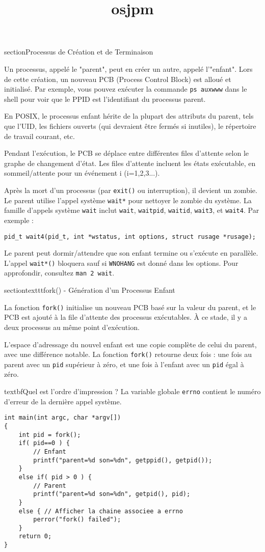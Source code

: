 \documentclass[12pt]{article}
\title{osjpm}
\author{}
\date{}
\begin{document}
\maketitle
\tableofcontents
\newpage

section{Processus de Création et de Terminaison}

Un processus, appelé le "parent", peut en créer un autre, appelé l'"enfant". Lors de cette création, un nouveau PCB (Process Control Block) est alloué et initialisé. Par exemple, vous pouvez exécuter la commande \texttt{ps auxwww} dans le shell pour voir que le PPID est l'identifiant du processus parent.

En POSIX, le processus enfant hérite de la plupart des attributs du parent, tels que l'UID, les fichiers ouverts (qui devraient être fermés si inutiles), le répertoire de travail courant, etc.

Pendant l'exécution, le PCB se déplace entre différentes files d'attente selon le graphe de changement d'état. Les files d'attente incluent les états exécutable, en sommeil/attente pour un événement i (i=1,2,3...).

Après la mort d'un processus (par \texttt{exit()} ou interruption), il devient un zombie. Le parent utilise l'appel système \texttt{wait*} pour nettoyer le zombie du système. La famille d'appels système \texttt{wait} inclut \texttt{wait}, \texttt{waitpid}, \texttt{waitid}, \texttt{wait3}, et \texttt{wait4}. Par exemple :

\begin{lstlisting}
pid_t wait4(pid_t, int *wstatus, int options, struct rusage *rusage);
\end{lstlisting}

Le parent peut dormir/attendre que son enfant termine ou s'exécute en parallèle. L'appel \texttt{wait*()} bloquera sauf si \texttt{WNOHANG} est donné dans les options. Pour approfondir, consultez \texttt{man 2 wait}.

section{texttt{fork()} - Génération d'un Processus Enfant}

La fonction \texttt{fork()} initialise un nouveau PCB basé sur la valeur du parent, et le PCB est ajouté à la file d'attente des processus exécutables. À ce stade, il y a deux processus au même point d'exécution.

L'espace d'adressage du nouvel enfant est une copie complète de celui du parent, avec une différence notable. La fonction \texttt{fork()} retourne deux fois : une fois au parent avec un \texttt{pid} supérieur à zéro, et une fois à l'enfant avec un \texttt{pid} égal à zéro.

textbf{Quel est l'ordre d'impression ?} La variable globale \texttt{errno} contient le numéro d'erreur de la dernière appel système.

\begin{lstlisting}
int main(int argc, char *argv[])
{
    int pid = fork();
    if( pid==0 ) {
        // Enfant
        printf("parent=%d son=%dn", getppid(), getpid());
    }
    else if( pid > 0 ) {
        // Parent
        printf("parent=%d son=%dn", getpid(), pid);
    }
    else { // Afficher la chaine associee a errno
        perror("fork() failed");
    }
    return 0;
}
\end{lstlisting}
\end{document}
